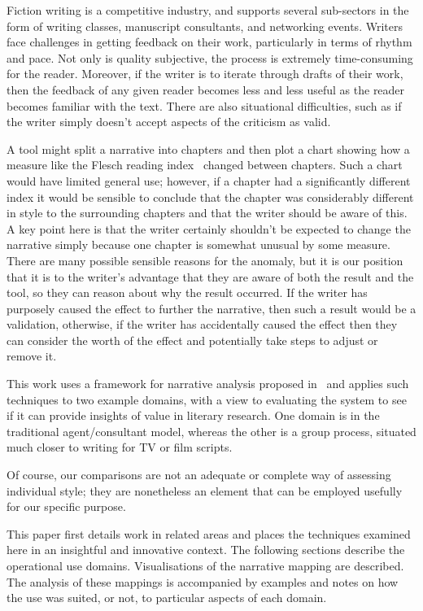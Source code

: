 \documentclass{article}
\begin{document}
Fiction writing is a competitive industry, and supports several sub-sectors in the form of writing classes, manuscript consultants, and networking events. Writers face challenges in getting feedback on their work, particularly in terms of rhythm and pace.  Not only is quality subjective, the process is extremely time-consuming for the reader.  Moreover, if the writer is to iterate through drafts of their work, then the feedback of any given reader becomes less and less useful as the reader becomes familiar with the text. There are also situational difficulties, such as if the writer simply doesn't accept aspects of the criticism as valid. 

A \naive tool might  split a narrative into chapters and then plot a chart showing how a measure like the Flesch reading index~\cite{flesch1948new} changed between chapters. Such a chart would have limited general use; however, if a chapter had a significantly different  index it would be sensible to conclude that the chapter was considerably different in style to the surrounding chapters and that the writer should be aware of this.   A key point here is that the writer certainly shouldn't be expected to change the narrative simply because one chapter is somewhat unusual by some measure. There are many possible  sensible reasons for the anomaly, but it is our position that it is to the writer's advantage that they are aware of both the result and the tool, so they can reason about why the result occurred.  If the writer has purposely caused the effect to further the narrative, then such a result would be a validation, otherwise, if the writer has accidentally caused the effect then they can consider the worth of the effect and potentially take steps to adjust or remove it.


This work uses a framework for narrative analysis proposed in~\cite{Murtagh2009302} and applies such techniques to two example domains, with a view to evaluating the system to see if it can provide insights of value in literary research.  One domain is in the traditional agent/consultant model, whereas the other is a group process, situated much closer to writing for TV or film scripts.

Of course, our comparisons are not an adequate or complete way of assessing individual style; they are nonetheless an element that can be employed usefully for our specific purpose.

This paper first details work in related areas and places the techniques examined here in an insightful and innovative context.   The following sections describe the operational use domains.  Visualisations of the narrative mapping are described.  The analysis of these mappings is accompanied by examples and notes on how the use was suited, or not, to particular aspects of each domain.  
\end{document}
